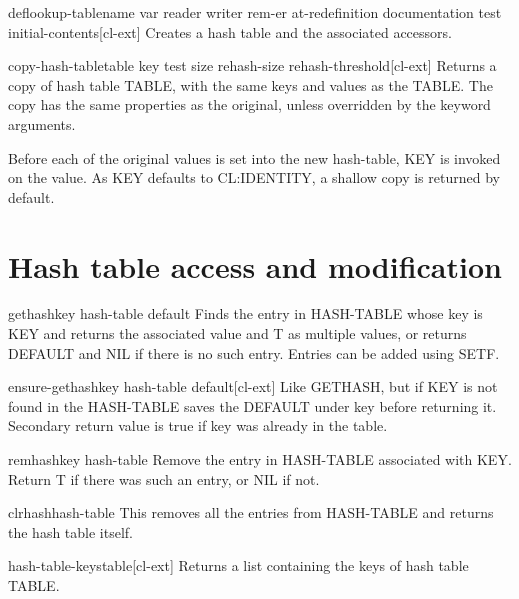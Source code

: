 \documentclass[10pt,english]{book}
\begin{document}
\begin{macro}{deflookup-table}{name \key var reader writer rem-er at-redefinition documentation test initial-contents}[cl-ext]
  Creates a hash table and the associated accessors.
\end{macro}

\begin{function}{copy-hash-table}{table \key key test size rehash-size rehash-threshold}[cl-ext]
  Returns a copy of hash table TABLE, with the same keys and values
as the TABLE. The copy has the same properties as the original, unless
overridden by the keyword arguments.

Before each of the original values is set into the new hash-table, KEY
is invoked on the value. As KEY defaults to CL:IDENTITY, a shallow
copy is returned by default.
\end{function}

\section{Hash table access and modification}
\label{sec:hash-table-access}

\begin{accessor}{gethash}{key hash-table \op default}
  Finds the entry in HASH-TABLE whose key is KEY and returns the
associated value and T as multiple values, or returns DEFAULT and NIL
if there is no such entry. Entries can be added using SETF.
\end{accessor}

\begin{function}{ensure-gethash}{key hash-table \op default}[cl-ext]
  Like GETHASH, but if KEY is not found in the HASH-TABLE saves the DEFAULT
under key before returning it. Secondary return value is true if key was
already in the table.
\end{function}

\begin{function}{remhash}{key hash-table}
  Remove the entry in HASH-TABLE associated with KEY. Return T if
there was such an entry, or NIL if not.
\end{function}

\begin{function}{clrhash}{hash-table}
  This removes all the entries from HASH-TABLE and returns the hash
table itself.
\end{function}

\begin{function}{hash-table-keys}{table}[cl-ext]
  Returns a list containing the keys of hash table TABLE.
\end{function}
\end{document}
